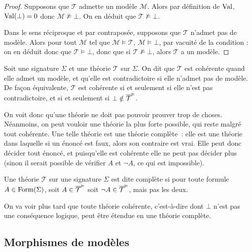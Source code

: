 \begin{proof}
  Supposons que $\mathcal T$ admette un modèle $\mathcal M$. Alors par
  définition de $\operatorname{Val}$, $\operatorname{Val}(\bot) = 0$ donc $\mathcal M\not\models \bot$. On
  en déduit que $\mathcal T\nvDash\bot$.

  Dans le sens réciproque et par contraposée, supposons que $\mathcal T$ n'admet
  pas de modèle. Alors pour tout $\mathcal M$ tel que
  $\mathcal M\models \mathcal T$, $\mathcal M\models \bot$, par vacuité de la
  condition : on en déduit donc que $\mathcal T \vDash \bot$, donc que si
  $\mathcal T \nvDash\bot$, alors $\mathcal T$ a un modèle.
\end{proof}

\begin{definition}
  Soit une signature $\Sigma$ et une théorie $\mathcal T$ sur $\Sigma$. On dit
  que $\mathcal T$ est cohérente quand elle admet un modèle, et qu'elle est
  contradictoire si elle n'admet pas de modèle. De façon équivalente,
  $\mathcal T$ est cohérente si et seulement si elle n'est pas contradictoire,
  et si et seulement si $\bot\notin\overline{\mathcal T}^{\vDash}$.
\end{definition}

On voit donc qu'une théorie ne doit pas pouvoir prouver trop de choses.
Néanmoins, on peut vouloir une théorie la plus forte possible, qui reste malgré
tout cohérente. Une telle théorie est une théorie complète~: elle est une
théorie dans laquelle si un énoncé est faux, alors son contraire est vrai. Elle
peut donc décider tout énoncé, et puisqu'elle est cohérente elle ne peut pas
décider plus (sinon il serait possible de vérifier $A$ et $\lnot A$, ce qui est
impossible).

\begin{definition}
  Une théorie $\mathcal T$ sur une signature $\Sigma$ est dite complète si pour
  toute formule $A\in\operatorname{Form}(\Sigma)$, soit $A\in \overline{\mathcal T}^{\vDash}$ soit
  $\lnot A \in \overline{\mathcal T}^{\vDash}$, mais pas les deux.
\end{definition}

On va voir plus tard que toute théorie cohérente, c'est-à-dire dont $\bot$ n'est
pas une conséquence logique, peut être étendue en une théorie complète.

\subsection{Morphismes de modèles}

